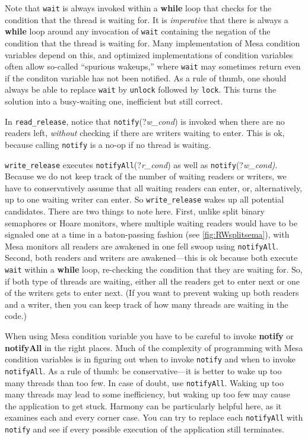 \documentclass{report}
\begin{document}
Note that \texttt{wait} is always invoked within a \textbf{while}
loop that checks for the condition that the thread is waiting for.
It is \emph{imperative} that there is always a \textbf{while} loop
around any invocation of \texttt{wait} containing the negation of
the condition that the thread is waiting for.  Many implementation
of Mesa condition variables depend on this, and optimized implementations
of condition variables often allow so-called ``spurious wakeups,''
where \texttt{wait} may sometimes return even if the conditon
variable has not been notified.
As a rule of thumb, one should always be able to replace \texttt{wait}
by \texttt{unlock} followed by \texttt{lock}.
This turns the solution into a busy-waiting one, inefficient but still
correct.

In \texttt{read\_release}, notice that \texttt{notify}(?\textit{w\_cond})
is invoked when there are no readers left, \emph{without} checking
if there are writers waiting to enter.  This is
ok, because calling \texttt{notify} is a no-op if no thread is
waiting.

\texttt{write\_release} executes \texttt{notifyAll}(?\textit{r\_cond})
as well as \texttt{notify}(?\textit{w\_cond)}.  Because we
do not keep track of the number of waiting readers or writers, we
have to conservatively assume that all waiting readers can enter,
or, alternatively, up to one waiting writer can enter.  So
\texttt{write\_release} wakes up all potential candidates.  There
are two things to note here.  First, unlike split binary semaphores
or Hoare monitors, where multiple waiting readers would have to be
signaled one at a time in a baton-passing fashion (see
\autoref{fig:RWsplitsema}), with Mesa monitors all readers are
awakened in one fell swoop using \texttt{notifyAll}.  Second, both
readers and writers are awakened---this is ok because both execute
\texttt{wait} within a \textbf{while} loop, re-checking the condition
that they are waiting for.  So, if both type of threads are waiting,
either all the readers get to enter next or one of the writers gets
to enter next.  (If you want to prevent waking up both readers and
a writer, then you can keep track of how many threads are waiting
in the code.)

When using Mesa condition variable you have to be careful to invoke
\textbf{notify} or \textbf{notifyAll} in the right places.
Much of the complexity of programming with Mesa condition variables
is in figuring out when to invoke \texttt{notify} and when to invoke
\texttt{notifyAll}.  As a rule of thumb: be conservative---it is
better to wake up too many threads than too few.
In case of doubt, use \texttt{notifyAll}.
Waking up too
many threads may lead to some inefficiency, but waking up too few
may cause the application to get stuck.  Harmony can be particularly
helpful here, as it examines each and every corner case.
You can try to replace each \texttt{notifyAll} with \texttt{notify} and see
if every possible execution of the application still terminates.
\end{document}
